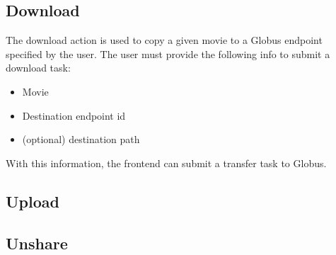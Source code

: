 \subsection{Download}

The download action is used to copy a given movie to a Globus endpoint specified by the user.
The user must provide the following info to submit a download task:

\begin{itemize}\itemsep1pt
    \item Movie
    \item Destination endpoint id
    \item (optional) destination path
\end{itemize}

\noindent With this information, the frontend can submit a transfer task to Globus.

\subsection{Upload}

\subsection{Unshare}
